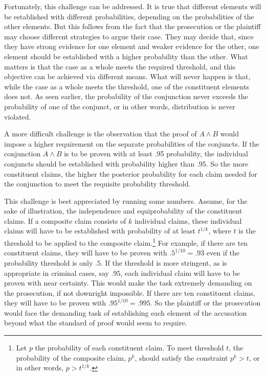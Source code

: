 \documentclass[
  10pt,
  dvipsnames,enabledeprecatedfontcommands]{scrartcl}
\newcommand{\et}{\wedge}
\begin{document}
Fortunately, this challenge can be addressed. It is true that different
elements will be established with different probabilities, depending on
the probabilities of the other elements. But this follows from the fact
that the prosecution or the plaintiff may choose different strategies to
argue their case. They may decide that, since they have strong evidence
for one element and weaker evidence for the other, one element should be
established with a higher probability than the other. What matters is
that the case as a whole meets the required threshold, and this
objective can be achieved via different means. What will never happen is
that, while the case as a whole meets the threshold, one of the
constituent elements does not. As seen earlier, the probability of the
conjunction never exceeds the probability of one of the conjunct, or in
other words, distribution is never violated.

A more difficult challenge is the observation that the proof of
\(A\et B\) would impose a higher requirement on the separate
probabilities of the conjuncts. If the conjunction \(A\et B\) is to be
proven with at least .95 probability, the individual conjuncts should be
established with probability higher than .95. So the more constituent
claims, the higher the posterior probability for each claim needed for
the conjunction to meet the requisite probability threshold.

This challenge is best appreciated by running some numbers. Assume, for
the sake of illustration, the independence and equiprobability of the
constituent claims. If a composite claim consists of \(k\) individual
claims, these individual claims will have to be established with
probability of at least \(t^{1/k}\), where \(t\) is the threshold to be
applied to the composite
claim.\footnote{Let $p$ the probability of each constituent claim. To meet threshold $t$, the probability of the composite claim, $p^k$, should satisfy the constraint $p^k>t$, or in other words, $p>t^{1/k}$.}
For example, if there are ten constituent claims, they will have to be
proven with \(.5^{1/10}=.93\) even if the probability threshold is only
\(.5\). If the threshold is more stringent, as is appropriate in
criminal cases, say \(.95\), each individual claim will have to be
proven with near certainty. This would make the task extremely demanding
on the prosecution, if not downright impossible. If there are ten
constituent claims, they will have to be proven with
\(.95^{1/10}=.995\). So the plaintiff or the prosecution would face the
demanding task of establishing each element of the accusation beyond
what the standard of proof would seem to require.
\end{document}
